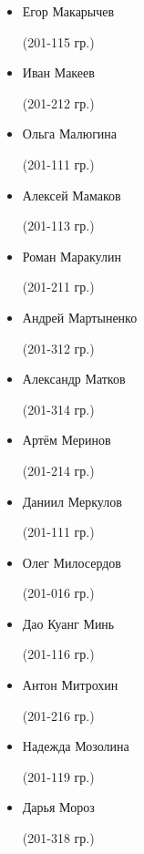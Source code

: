 \begin{multicols}{2}
\begin{small}
\begin{itemize}[leftmargin=0.5em]
	\item[] Егор Макарычев\begin{tiny} (201-115 гр.)\end{tiny}
	\item[] Иван Макеев\begin{tiny} (201-212 гр.)\end{tiny} %
	\item[] Ольга Малюгина\begin{tiny} (201-111 гр.)\end{tiny}
	\item[] Алексей Мамаков\begin{tiny} (201-113 гр.)\end{tiny} %
	\item[] Роман Маракулин\begin{tiny} (201-211 гр.)\end{tiny}
	\item[] Андрей Мартыненко\begin{tiny} (201-312 гр.)\end{tiny}
	\item[] Александр Матков\begin{tiny} (201-314 гр.)\end{tiny} %
	\item[] Артём Меринов\begin{tiny} (201-214 гр.)\end{tiny}
	\item[] Даниил Меркулов\begin{tiny} (201-111 гр.)\end{tiny}
	\item[] Олег Милосердов\begin{tiny} (201-016 гр.)\end{tiny}
	\item[] Дао Куанг Минь\begin{tiny} (201-116 гр.)\end{tiny}
	\item[] Антон Митрохин\begin{tiny} (201-216 гр.)\end{tiny} %
	\item[] Надежда Мозолина\begin{tiny} (201-119 гр.)\end{tiny}
	\item[] Дарья Мороз\begin{tiny} (201-318 гр.)\end{tiny} %


\end{itemize}
\end{small}
\end{multicols}
